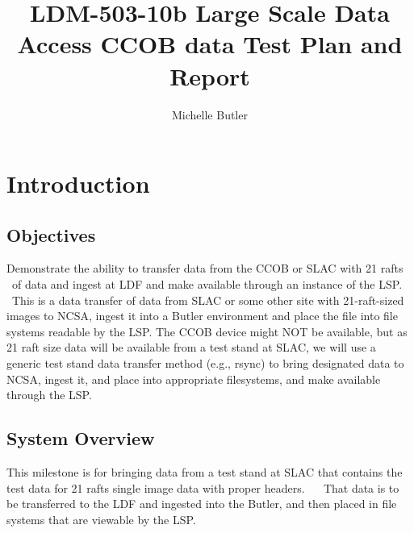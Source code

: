 \documentclass[DM,lsstdraft,STR,toc]{lsstdoc}
\begin{document}
\def\milestoneName{Large Scale Data Access CCOB data}
\def\milestoneId{LDM-503-10b}
\def\product{DBB Services}


\title{ LDM-503-10b Large Scale Data Access CCOB data Test Plan and Report}
\setDocRef{\lsstDocType-\lsstDocNum}
\date{\vcsdate}
\author{ Michelle Butler }






\maketitle

\section{Introduction}
\label{sect:intro}


\subsection{Objectives}
\label{sect:objectives}

 Demonstrate the ability to transfer data from the CCOB or SLAC with 21
rafts ~of data and ingest at LDF and make available through an instance
of the LSP. ~This is a data transfer of data from SLAC or some other
site with 21-raft-sized images to NCSA, ingest it into a Butler
environment and place the file into file systems readable by the LSP.
The CCOB device might NOT be available, but as 21 raft size data will be
available from a test stand at SLAC, we will use a generic test stand
data transfer method (e.g., rsync) to bring designated data to NCSA,
ingest it, and place into appropriate filesystems, and make available
through the LSP.



\subsection{System Overview}
\label{sect:systemoverview}

 This milestone is for bringing data from a test stand at SLAC that
contains the test data for 21 rafts single image data with proper
headers. ~ ~That data is to be transferred to the LDF and ingested into
the Butler, and then placed in file systems that are viewable by the
LSP. ~\\[2\baselineskip]
\end{document}
